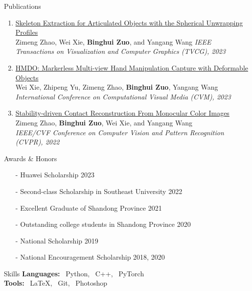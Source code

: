 \documentclass{template_2311} %
\def\myname{\textbf{Binghui Zuo}}
\begin{document}
\begin{rSection}{Publications}
\begin{enumerate}
\item \href{https://ieeexplore.ieee.org/document/10025400} {Skeleton Extraction for Articulated Objects with the Spherical Unwrapping Profiles}\\
Zimeng Zhao, Wei Xie, \myname, and Yangang Wang
\emph{IEEE Transactions on Visualization and Computer Graphics (TVCG), 2023}

\item \href{} {HMDO: Markerless Multi-view Hand Manipulation Capture with Deformable Objects} \\
Wei Xie, Zhipeng Yu, Zimeng Zhao, \myname, Yangang Wang\\
\emph{International Conference on Computational Visual Media (CVM), 2023}

\item \href{https://openaccess.thecvf.com/content/CVPR2022/papers/Zhao_Stability-Driven_Contact_Reconstruction_From_Monocular_Color_Images_CVPR_2022_paper.pdf} {Stability-driven Contact Reconstruction From Monocular Color Images}\\
Zimeng Zhao, \myname, Wei Xie, and Yangang Wang\\
\emph{IEEE/CVF Conference on Computer Vision and Pattern Recognition (CVPR), 2022} 
\end{enumerate}
\end{rSection}
\begin{rSection}{Awards \& Honors}
\begin{itemize}
    \item[-] Huawei Scholarship \hfill 2023
    \item[-] Second-class Scholarship in Southeast University \hfill 2022
    \item[-] Excellent Graduate of Shandong Province \hfill 2021
    \item[-] Outstanding college students in Shandong Province \hfill 2020
    \item[-] National Scholarship \hfill 2019
    \item[-] National Encouragement Scholarship \hfill 2018, 2020
\end{itemize}
\end{rSection}

\begin{rSection}{Skills}
    {\bf Languages:}  ~Python, ~C++, ~PyTorch \\
    {\bf Tools:} ~\LaTeX, ~Git, ~Photoshop
\end{rSection}
\end{document}
